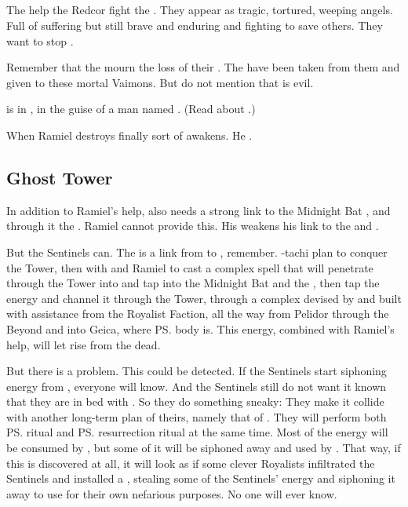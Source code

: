 \subsection{\Kezerad}
The \Kezeradi help the Redcor fight the \banes. 
They appear as tragic, tortured, weeping angels. 
Full of suffering but still brave and enduring and fighting to save others. 
They want to stop \Belzir. 

Remember that the \Kezeradi mourn the loss of their . 
The \beacons have been taken from them and given to these mortal Vaimons. 
But do not mention that \iquin is evil. 

\Sithiyacaan is in \Redce, in the guise of a \human man named . 
(Read about \Herette.)

When Ramiel destroys \Redce \Sithiyacaan finally sort of awakens. 
He .










\subsection{Ghost Tower}
In addition to Ramiel's help, \Shiaraid{} also needs a strong link to the Midnight Bat \matrix, and through it the \Erebean{} \dweomer. 
Ramiel cannot provide this. 
His \kenosis{} weakens his link to the \matrix{} and \dweomer. 

But the Sentinels can. 
The  is a link from \Azmith{} to \Nyx, remember. 
\Secherdamon-tachi plan to conquer the Tower, then \cooperate{} with \Shiaraid{} and Ramiel to cast a complex spell that will penetrate through the Tower into \Nyx{} and tap into the Midnight Bat and the \dweomer, then tap the energy and channel it through the Tower, through a complex  devised by \Vizsherioch{} and built with assistance from the Royalist Faction, all the way from Pelidor through the Beyond and into Geica, where \ps{\Belzir} body is. 
This energy, combined with Ramiel's help, will let \Shiaraid{} rise from the dead. 

But there is a problem. 
This could be detected. 
If the Sentinels start siphoning energy from \Nyx, everyone will know. 
And the Sentinels still do not want it known that they are in bed with \Shiaraid. 
So they do something sneaky: 
They make it collide with another long-term plan of theirs, namely that of . 
They will perform both \ps{\Vizsherioch} \shaeeroth{} ritual and \ps{\Shiaraid} resurrection ritual at the same time. 
Most of the energy will be consumed by \Vizsherioch, but some of it will be siphoned away and used by \Shiaraid. 
That way, if this is discovered at all, it will look as if some clever Royalists infiltrated the Sentinels and installed a , stealing some of the Sentinels' energy and siphoning it away to use for their own nefarious purposes. 
No one will ever know. 

